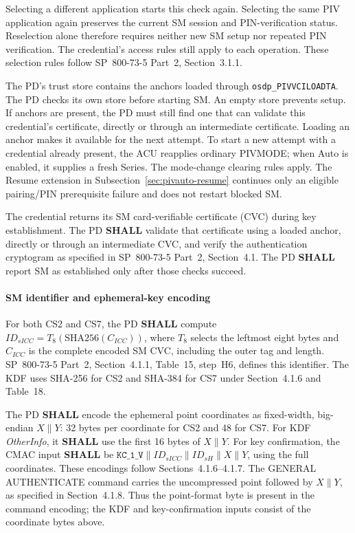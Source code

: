 Selecting a different application starts this check again. Selecting the same
PIV application again preserves the current SM session and PIN-verification
status. Reselection alone therefore requires neither new SM setup nor repeated
PIN verification. The credential's access rules still apply to each operation. These selection
rules follow SP~800-73-5 Part~2, Section~3.1.1.

The PD's trust store contains the anchors loaded through
\texttt{osdp\_PIVVCILOADTA}. The PD checks its own store before starting SM.
An empty store prevents setup. If anchors are present, the PD must still find
one that can validate this credential's certificate, directly or through an
intermediate certificate. Loading an anchor makes it available for the next
attempt. To start a new attempt with a credential already present, the ACU reapplies
ordinary PIVMODE; when Auto is enabled, it supplies a fresh Series. The mode-change
clearing rules apply.
The Resume extension in Subsection~\ref{sec:pivauto-resume} continues only an eligible
pairing/PIN prerequisite failure and does not restart blocked SM.

The credential returns its SM card-verifiable certificate (CVC) during key
establishment. The PD \textbf{SHALL} validate that certificate using a loaded
anchor, directly or through an intermediate CVC, and verify the authentication
cryptogram as specified in
SP~800-73-5 Part~2, Section~4.1. The PD \textbf{SHALL} report SM as established
only after those checks succeed.

\paragraph{SM identifier and ephemeral-key encoding}
For both CS2 and CS7, the PD \textbf{SHALL} compute
\(ID_{sICC} = T_8(\mathrm{SHA256}(C_{ICC}))\), where \(T_8\) selects the
leftmost eight bytes and \(C_{ICC}\) is the complete encoded SM CVC, including
the outer  tag and length. SP~800-73-5 Part~2, Section~4.1.1,
Table~15, step~H6, defines this identifier. The KDF uses SHA-256 for CS2 and
SHA-384 for CS7 under Section~4.1.6 and Table~18.

The PD \textbf{SHALL} encode the ephemeral point coordinates as fixed-width,
big-endian \(X \mathbin{\|} Y\): 32 bytes per coordinate for CS2 and 48 for CS7.
For KDF \emph{OtherInfo}, it \textbf{SHALL} use the first 16 bytes of
\(X \mathbin{\|} Y\). For key confirmation, the CMAC input \textbf{SHALL} be
\(\texttt{KC\_1\_V} \mathbin{\|} ID_{sICC} \mathbin{\|} ID_{sH}
\mathbin{\|} X \mathbin{\|} Y\), using the full coordinates. These encodings
follow Sections~4.1.6--4.1.7. The GENERAL AUTHENTICATE command carries the
uncompressed point  followed by \(X \mathbin{\|} Y\), as specified
in Section~4.1.8. Thus the point-format byte is present in the command encoding;
the KDF and key-confirmation inputs consist of the coordinate bytes above.

